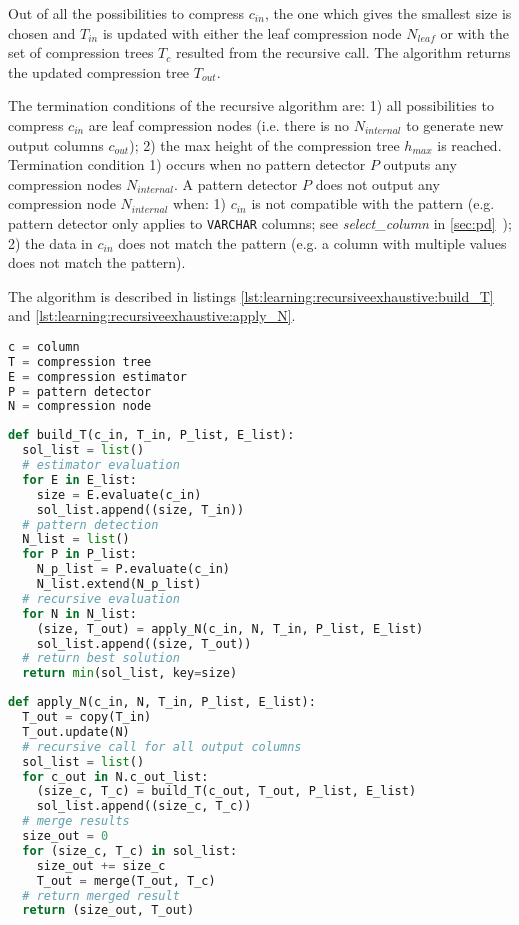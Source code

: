 Out of all the possibilities to compress \(c_{in}\), the one which gives the smallest size is chosen and \(T_{in}\) is updated with either the leaf compression node \(N_{leaf}\) or with the set of compression trees \(T_{c}\) resulted from the recursive call. The algorithm returns the updated compression tree \(T_{out}\).

The termination conditions of the recursive algorithm are: 1) all possibilities to compress \(c_{in}\) are leaf compression nodes (i.e. there is no \(N_{internal}\) to generate new output columns \(c_{out}\)); 2) the max height of the compression tree \(h_{max}\) is reached. Termination condition 1) occurs when no pattern detector \(P\) outputs any compression nodes \(N_{internal}\). A pattern detector \(P\) does not output any compression node \(N_{internal}\) when: 1) \(c_{in}\) is not compatible with the pattern (e.g.  pattern detector only applies to \verb|VARCHAR| columns; see \textit{select\_column} in \ref{sec:pd}~); 2) the data in \(c_{in}\) does not match the pattern (e.g. a column with multiple values does not match the  pattern).

The algorithm is described in listings \ref{lst:learning:recursiveexhaustive:build_T} and \ref{lst:learning:recursiveexhaustive:apply_N}.

\begin{lstlisting}[language=Python,
label={lst:learning:recursiveexhaustive:naming},
caption={Naming conventions}]
c = column
T = compression tree
E = compression estimator
P = pattern detector
N = compression node
\end{lstlisting}

\begin{lstlisting}[language=Python,
label={lst:learning:recursiveexhaustive:build_T},
caption={build\_T (recursive exhaustive)}]
def build_T(c_in, T_in, P_list, E_list):
  sol_list = list()
  # estimator evaluation
  for E in E_list:
    size = E.evaluate(c_in)
    sol_list.append((size, T_in))
  # pattern detection 
  N_list = list()
  for P in P_list:
    N_p_list = P.evaluate(c_in)
    N_list.extend(N_p_list)
  # recursive evaluation
  for N in N_list:
    (size, T_out) = apply_N(c_in, N, T_in, P_list, E_list)
    sol_list.append((size, T_out))
  # return best solution
  return min(sol_list, key=size)
\end{lstlisting}

\begin{lstlisting}[language=Python,
label={lst:learning:recursiveexhaustive:apply_N},
caption={apply\_N (recursive exhaustive)}]
def apply_N(c_in, N, T_in, P_list, E_list):
  T_out = copy(T_in)
  T_out.update(N)
  # recursive call for all output columns
  sol_list = list()
  for c_out in N.c_out_list:
    (size_c, T_c) = build_T(c_out, T_out, P_list, E_list)
    sol_list.append((size_c, T_c))
  # merge results
  size_out = 0
  for (size_c, T_c) in sol_list:
    size_out += size_c
    T_out = merge(T_out, T_c)
  # return merged result
  return (size_out, T_out)
\end{lstlisting}
\bigskip

